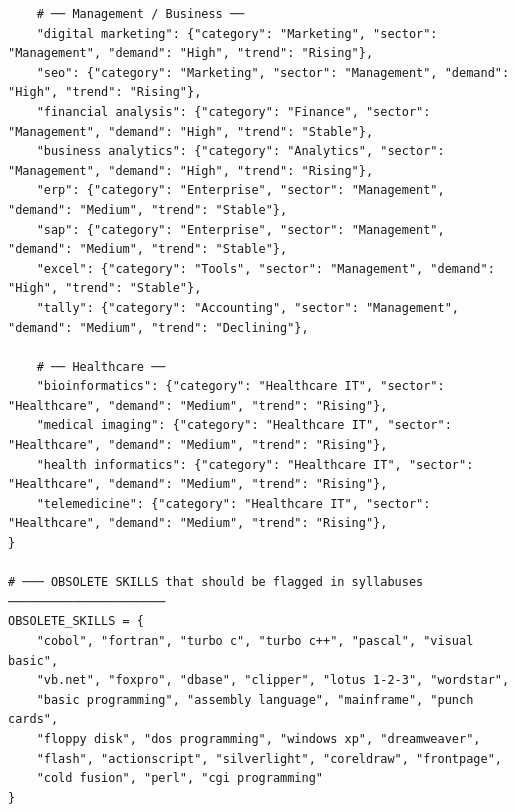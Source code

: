 \documentclass[12pt,a4paper]{report}
\begin{document}
\begin{verbatim}
    # ── Management / Business ──
    "digital marketing": {"category": "Marketing", "sector": "Management", "demand": "High", "trend": "Rising"},
    "seo": {"category": "Marketing", "sector": "Management", "demand": "High", "trend": "Rising"},
    "financial analysis": {"category": "Finance", "sector": "Management", "demand": "High", "trend": "Stable"},
    "business analytics": {"category": "Analytics", "sector": "Management", "demand": "High", "trend": "Rising"},
    "erp": {"category": "Enterprise", "sector": "Management", "demand": "Medium", "trend": "Stable"},
    "sap": {"category": "Enterprise", "sector": "Management", "demand": "Medium", "trend": "Stable"},
    "excel": {"category": "Tools", "sector": "Management", "demand": "High", "trend": "Stable"},
    "tally": {"category": "Accounting", "sector": "Management", "demand": "Medium", "trend": "Declining"},

    # ── Healthcare ──
    "bioinformatics": {"category": "Healthcare IT", "sector": "Healthcare", "demand": "Medium", "trend": "Rising"},
    "medical imaging": {"category": "Healthcare IT", "sector": "Healthcare", "demand": "Medium", "trend": "Rising"},
    "health informatics": {"category": "Healthcare IT", "sector": "Healthcare", "demand": "Medium", "trend": "Rising"},
    "telemedicine": {"category": "Healthcare IT", "sector": "Healthcare", "demand": "Medium", "trend": "Rising"},
}

# ─── OBSOLETE SKILLS that should be flagged in syllabuses ──────────────────────
OBSOLETE_SKILLS = {
    "cobol", "fortran", "turbo c", "turbo c++", "pascal", "visual basic",
    "vb.net", "foxpro", "dbase", "clipper", "lotus 1-2-3", "wordstar",
    "basic programming", "assembly language", "mainframe", "punch cards",
    "floppy disk", "dos programming", "windows xp", "dreamweaver",
    "flash", "actionscript", "silverlight", "coreldraw", "frontpage",
    "cold fusion", "perl", "cgi programming"
}


\end{verbatim}
\end{document}
